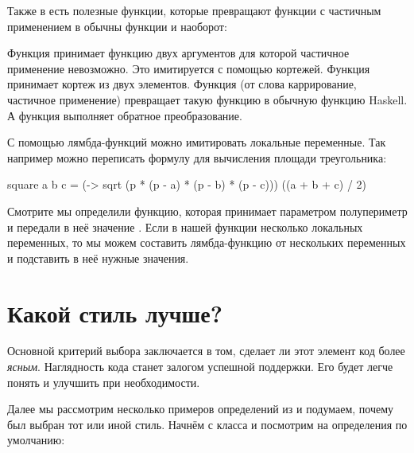 Также в  есть полезные функции, которые превращают функции
с частичным применением в обычны функции и наоборот:


Функция  принимает функцию двух аргументов 
для которой частичное применение невозможно. Это имитируется
с помощью кортежей. Функция принимает кортеж из двух элементов.
Функция  (от слова каррирование, частичное применение) 
превращает такую функцию в обычную функцию Haskell. А функция
 выполняет обратное преобразование.


С помощью лямбда-функций можно имитировать локальные переменные.
Так например можно переписать формулу для вычисления площади 
треугольника:

\begin{code}
square a b c = 
    (\p -> sqrt (p * (p - a) * (p - b) * (p - c))) 
    ((a + b + c) / 2)
\end{code}

Смотрите мы определили функцию, которая принимает параметром
полупериметр  и передали в неё значение .
Если в нашей функции несколько локальных переменных, то мы можем
составить лямбда-функцию от нескольких переменных и подставить
в неё нужные значения.

\section{Какой стиль лучше?}

Основной критерий выбора заключается в том, сделает
ли этот элемент код более \emph{ясным}.
Наглядность кода станет залогом успешной поддержки. Его будет
легче понять и улучшить при необходимости. 

Далее мы рассмотрим несколько примеров определений
из  и подумаем, почему был выбран тот или
иной стиль.
Начнём с класса  и посмотрим на определения
по умолчанию:


